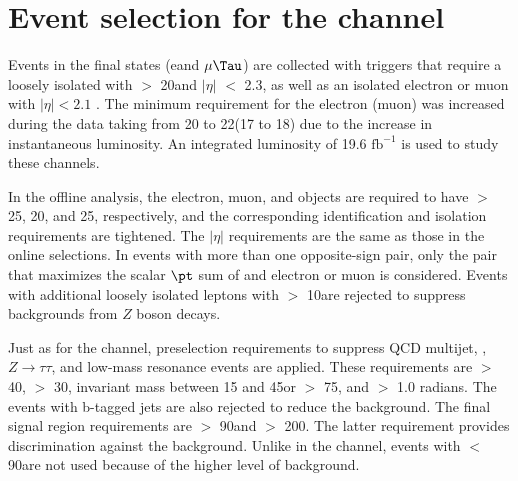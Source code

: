 \section{\texorpdfstring{Event selection for the \leptonTau channel}{Event selection for the lepton-tau channel}}
\label{sect:eleTauCuts}
Events in the \leptonTau final states (e\Tau and $\mu\Tau$)
are collected with triggers that require 
a loosely isolated \Tau with \PT $>$ 20\GeV and $|\eta|$ $<$ 2.3, as well as
an isolated electron or muon with $|\eta| < 2.1$ \cite{Chatrchyan:2011nv,Khachatryan:2015hwa,Chatrchyan:2012xi}.  The minimum
\PT requirement for the electron (muon) was increased during the data taking from 20 to 22\GeV (17 to 18\GeV)
due to the increase in instantaneous luminosity. An integrated luminosity of 19.6 $\mathrm{fb}^{-1}$ is used to study these channels.

In the offline analysis, the electron, muon, and \Tau objects are required to have \PT $>$ 25, 20, and 25\GeV, respectively, 
and the corresponding identification and isolation requirements are tightened. The $|\eta|$ requirements are the same as those in the online selections.
In events with more than one opposite-sign \leptonTau pair, only 
 the pair that maximizes the scalar $\pt$ sum of \Tau and electron or muon is considered.  Events with additional loosely isolated leptons
with \PT $>$ 10\GeV are rejected to suppress backgrounds from $Z$ boson
decays.  

Just as for the \tauTau channel, preselection requirements to suppress
QCD multijet, \ttbar, $Z \to \tau \tau$, and low-mass resonance events are applied.
These requirements are \mttwo $>$ 40\GeV, \MPT $>$ 30\GeV, \leptonTau 
invariant mass between 15 and 45\GeV or $>$ 75\GeV, and \deltaphi $>$ 1.0 radians. The events with b-tagged jets are also rejected to reduce the 
\ttbar background.
 The final signal region requirements are \mttwo $>$ 90\GeV and \tauMT $>$ 200\GeV. %
The latter requirement provides discrimination against the \wjets background.  Unlike in the \tauTau channel,
events with \mttwo $<$ 90\GeV are not used because of the higher 
level of background. 

